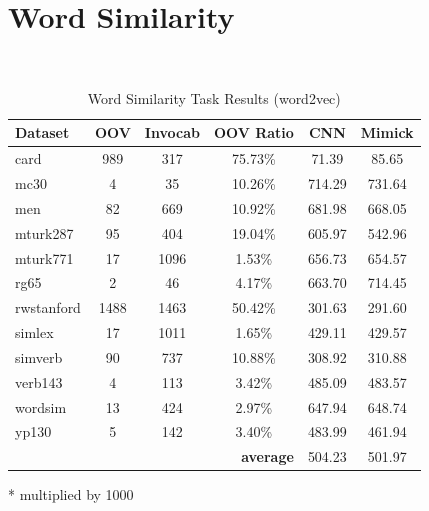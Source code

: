     \section{Word Similarity}
    \begin{table}[!ht]
      \begin{threeparttable} 
      \begin{center}
        \caption{Word Similarity Task Results (word2vec)}
        ~\\
        \label{tab:wordsim:word2vec}
        \begin{tabular}{l|c|c|c|c|c}
          \textbf{Dataset} & \textbf{OOV} & \textbf{Invocab} & \textbf{OOV Ratio} & \textbf{CNN}\tnote{*} & \textbf{Mimick}\tnote{*}\\
          \hline
          card & 989 & 317 & 75.73\% & 71.39 & 85.65\\
          mc30 & 4 & 35 & 10.26\% & 714.29 & 731.64\\
          men & 82 & 669 & 10.92\% & 681.98 & 668.05\\
          mturk287 & 95 & 404 & 19.04\% & 605.97 & 542.96\\
          mturk771 & 17 & 1096 & 1.53\% & 656.73 & 654.57\\
          rg65 & 2 & 46 & 4.17\% & 663.70 & 714.45\\
          rwstanford & 1488 & 1463 & 50.42\% & 301.63 & 291.60\\
          simlex & 17 & 1011 & 1.65\% & 429.11 & 429.57\\
          simverb & 90 & 737 & 10.88\% & 308.92 & 310.88\\
          verb143 & 4 & 113 & 3.42\% & 485.09 & 483.57\\
          wordsim & 13 & 424 & 2.97\% & 647.94 & 648.74\\
          yp130 & 5 & 142 & 3.40\% & 483.99 & 461.94\\
          \hline
          \multicolumn{4}{r|}{\textbf{average}} & 504.23 & 501.97\\
        \end{tabular}
        \begin{tablenotes}
          \item[*] multiplied by 1000
        \end{tablenotes}
      \end{center}
      
    \end{threeparttable} 
    \end{table}

